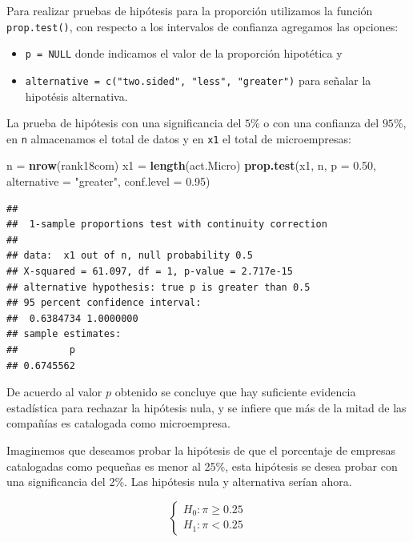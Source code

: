 \documentclass[letterpaper,]{book}
\newenvironment{Shaded}{\begin{snugshade}}{\end{snugshade}}
\newcommand{\DataTypeTok}[1]{\textcolor[rgb]{0.13,0.29,0.53}{#1}}
\newcommand{\FloatTok}[1]{\textcolor[rgb]{0.00,0.00,0.81}{#1}}
\newcommand{\KeywordTok}[1]{\textcolor[rgb]{0.13,0.29,0.53}{\textbf{#1}}}
\newcommand{\NormalTok}[1]{#1}
\newcommand{\StringTok}[1]{\textcolor[rgb]{0.31,0.60,0.02}{#1}}
\providecommand{\tightlist}{%
  \setlength{\itemsep}{0pt}\setlength{\parskip}{0pt}}
\begin{document}
Para realizar pruebas de hipótesis para la proporción utilizamos la función \texttt{prop.test()}, con respecto a los intervalos de confianza agregamos las opciones:

\begin{itemize}
\tightlist
\item
  \texttt{p\ =\ NULL} donde indicamos el valor de la proporción hipotética y
\item
  \texttt{alternative\ =\ c("two.sided",\ "less",\ "greater")} para señalar la hipotésis alternativa.
\end{itemize}

La prueba de hipótesis con una significancia del \(5\%\) o con una confianza del \(95\)\%, en \texttt{n} almacenamos el total de datos y en \texttt{x1} el total de microempresas:

\begin{Shaded}
\begin{Highlighting}[]
\NormalTok{n =}\StringTok{ }\KeywordTok{nrow}\NormalTok{(rank18com)}
\NormalTok{x1 =}\StringTok{ }\KeywordTok{length}\NormalTok{(act.Micro)}
\KeywordTok{prop.test}\NormalTok{(x1, n, }\DataTypeTok{p =} \FloatTok{0.50}\NormalTok{, }\DataTypeTok{alternative =} \StringTok{"greater"}\NormalTok{,  }\DataTypeTok{conf.level =} \FloatTok{0.95}\NormalTok{)}
\end{Highlighting}
\end{Shaded}

\begin{verbatim}
## 
##  1-sample proportions test with continuity correction
## 
## data:  x1 out of n, null probability 0.5
## X-squared = 61.097, df = 1, p-value = 2.717e-15
## alternative hypothesis: true p is greater than 0.5
## 95 percent confidence interval:
##  0.6384734 1.0000000
## sample estimates:
##         p 
## 0.6745562
\end{verbatim}

De acuerdo al valor \(p\) obtenido se concluye que hay suficiente evidencia estadística para rechazar la hipótesis nula, y se infiere que más de la mitad de las compañías es catalogada como microempresa.

Imaginemos que deseamos probar la hipótesis de que el porcentaje de empresas catalogadas como pequeñas es menor al 25\%, esta hipótesis se desea probar con una significancia del 2\%. Las hipótesis nula y alternativa serían ahora.

\begin{equation} 
\begin{cases} 
H_0: \pi \geq 0.25 \\ 
H_1: \pi < 0.25
\end{cases} 
\end{equation}
\end{document}
